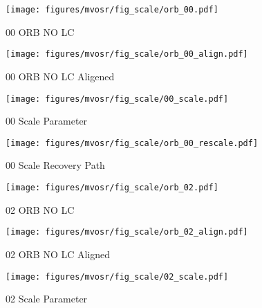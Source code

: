 \begin{figure*}[t]
    \centering
    \begin{subfigure}[b]{0.23\textwidth}
    \texttt{[image: figures/mvosr/fig\_scale/orb\_00.pdf]}
    \caption{00 ORB NO LC}
    \vspace*{1mm}
    \label{fig:orb_path_00}
    \end{subfigure}
    \begin{subfigure}[b]{0.23\textwidth}
        \texttt{[image: figures/mvosr/fig\_scale/orb\_00\_align.pdf]}
        \caption{00 ORB NO LC Aligened}
        \label{fig:orb_path_00_17}
        \vspace*{1mm}
        \end{subfigure}
        \begin{subfigure}[b]{0.23\textwidth}
            \texttt{[image: figures/mvosr/fig\_scale/00\_scale.pdf]}
            \caption{00 Scale Parameter}
            \label{fig:scale_00}
            \vspace*{1mm}
            \end{subfigure}
            \begin{subfigure}[b]{0.23\textwidth}
                \texttt{[image: figures/mvosr/fig\_scale/orb\_00\_rescale.pdf]}
                \caption{00 Scale Recovery Path}
                \label{fig:scaled_path_00}
                \vspace*{1mm}
                \vspace*{1mm}
                \end{subfigure}
    \begin{subfigure}[b]{0.23\textwidth}
        \texttt{[image: figures/mvosr/fig\_scale/orb\_02.pdf]}
        \caption{02 ORB NO LC}
        \vspace*{1mm}
        \label{fig:orb_path_02}
        \end{subfigure}
        \begin{subfigure}[b]{0.23\textwidth}
            \texttt{[image: figures/mvosr/fig\_scale/orb\_02\_align.pdf]}
            \caption{02 ORB NO LC Aligned}
            \label{fig:orb_path_02_aligned}
            \vspace*{1mm}
            \end{subfigure}
            \begin{subfigure}[b]{0.23\textwidth}
                \texttt{[image: figures/mvosr/fig\_scale/02\_scale.pdf]}
                \caption{02 Scale Parameter}

\end{subfigure}
\end{figure*}
